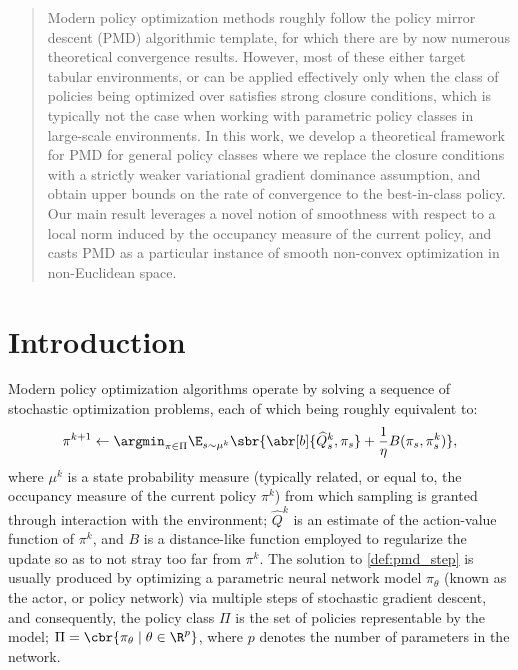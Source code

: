 

\begin{abstract}
    Modern policy optimization methods roughly follow the policy mirror descent (PMD) algorithmic template, for which there are by now numerous theoretical convergence results.
    However, most of these either target tabular environments, or can be applied effectively only when the class of policies being optimized over satisfies strong closure conditions, which is typically not the case when working with parametric policy classes in large-scale environments. 
    In this work, we develop a theoretical framework for PMD for general policy classes where we replace the closure conditions with a strictly weaker variational gradient dominance assumption, and obtain upper bounds on the rate of convergence to the best-in-class policy. Our main result leverages a novel notion of smoothness with respect to a local norm induced by the occupancy measure of the current policy, and casts PMD as a particular instance of smooth non-convex optimization in non-Euclidean space.
\end{abstract}
\section{Introduction}
Modern policy optimization algorithms 
\citep{peters2006policy,peters2008reinforcement,lillicrap2015continuous, schulman2015trust, schulman2017proximal} operate by solving a sequence of stochastic optimization problems, each of which being roughly equivalent to:
\begin{align}\label{def:pmd_step}
    \pi^{k+1}
    \gets 
    \argmin_{\pi\in \Pi}\E_{s \sim \mu^{k}}\sbr{
        \abr[b]{\widehat Q^{k}_s, \pi_s} 
        + \frac1\eta B(\pi_s, \pi_s^k)
    },
\end{align}
where $\mu^k$ is a state probability measure (typically related, or equal to, the occupancy measure of the current policy $\pi^k$) from which sampling is granted through interaction with the environment; $\widehat Q^k$ is an estimate of the action-value function of $\pi^k$, and $B$ is a distance-like function employed to regularize the update so as to not stray too far from $\pi^k$.
The solution to \cref{def:pmd_step} is usually produced by optimizing a parametric neural network model $\pi_\theta$ (known as the actor, or policy network) via multiple steps of stochastic gradient descent, and consequently, the policy class $\Pi$ is the set of policies representable by the model; $\Pi = \cbr{\pi_\theta \mid \theta \in \R^p}$, where $p$ denotes the number of parameters in the network.


